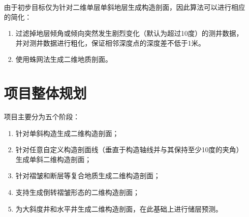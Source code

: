 \documentclass[a4paper,twoside]{ctexart}
\begin{document}
由于初步目标仅为针对二维单层单斜地层生成构造剖面，因此算法可以进行相应
的简化：
\begin{enumerate}[步骤 1:]
\item 过滤掉地层倾角或倾向突然发生剧烈变化（默认为超过10度）的测井数据，
  并对测井数据进行粗化，保证相邻深度点的深度差不低于1米。
\item 使用蛛网法生成二维地质剖面。
\end{enumerate}

\section{项目整体规划}
项目主要分为五个阶段：
\begin{enumerate}[第1阶段：]
\item 针对单斜构造生成二维构造剖面；
\item 针对任意自定义构造剖面线（垂直于构造轴线并与其保持至少10度的夹角）
  生成单斜二维构造剖面；
\item 针对褶皱和断层等复合地质生成二维构造剖面；
\item 支持生成倒转褶皱形态的二维构造剖面；
\item 为大斜度井和水平井生成二维构造剖面，在此基础上进行储层预测。
\end{enumerate}


\end{document}
